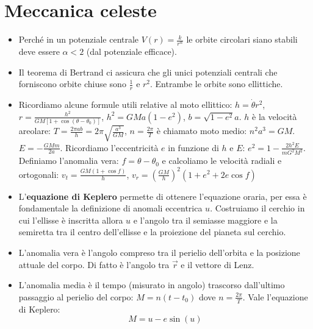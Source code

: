 \documentclass[11pt,a4paper]{article}
\begin{document}
\section{Meccanica celeste}

\begin{itemize}

\item Perché in un potenziale centrale $V(r) = \frac{k}{r^{\alpha}}$ le orbite circolari siano stabili deve essere $\alpha < 2$ (dal potenziale efficace).

\item Il teorema di Bertrand ci assicura che gli unici potenziali centrali che forniscono orbite chiuse sono $\frac{1}{r}$ e $r^2$. Entrambe le orbite sono ellittiche.

\item Ricordiamo alcune formule utili relative al moto ellittico: $h = \dot{\theta} r^2$, $r = \frac{h^2}{GM \left[ 1 + \cos \left( \theta-\theta_0 \right) \right]}$, $h^2 = GM a(1-e^2)$, $b = \sqrt{1-e^2} a$. $h$ è la velocità areolare: $T = \frac{2 \pi a b}{h} = 2 \pi \sqrt{\frac{a^3}{GM}}$, $n = \frac{2 \pi}{T}$ è chiamato moto medio: $n^2 a^3 = GM$. $E = - \frac{GMm}{2a}$. Ricordiamo l'eccentricità $e$ in funzione di $h$ e $E$: $e^2 = 1 - \frac{2 h^2 E}{m G^2 M ^2}$. Definiamo l'anomalia vera: $f = \theta - \theta_0$ e calcoliamo le velocità radiali e ortogonali: $v_t = \frac{GM \left( 1 + \cos f \right) }{h}$, $v_r = \left( \frac{GM}{h} \right)^2 \left( 1 + e^2 + 2 e \cos f \right)$

\item L'\textbf{equazione di Keplero} permette di ottenere l'equazione oraria, per essa è fondamentale la definizione di anomali eccentrica $u$. Costruiamo il cerchio in cui l'ellisse è inscritta allora $u$ e l'angolo tra il semiasse maggiore e la semiretta tra il centro dell'ellisse e la proiezione del pianeta sul cerchio.

\item L'anomalia vera è l'angolo compreso tra il perielio dell'orbita e la posizione attuale del corpo. Di fatto è l'angolo tra $\vec{r}$ e il vettore di Lenz.

\item L'anomalia media è il tempo (misurato in angolo) trascorso dall'ultimo passaggio al perielio del corpo: $M = n (t-t_0)$ dove $n = \frac{2 \pi}{T}$. Vale l'equazione di Keplero: 
\begin{equation}
M = u - e \sin (u)
\end{equation}


\end{itemize}
\end{document}
